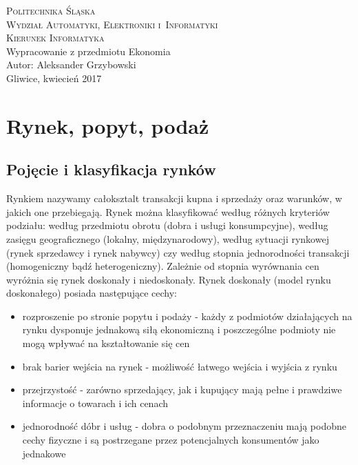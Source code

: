 \documentclass[12pt]{extarticle}
\begin{document}
\begin{titlepage}
    \begin{center}
        \textsc{\LARGE{Politechnika Śląska}}\\[0.5cm]
        \textsc{\LARGE{Wydział Automatyki, Elektroniki i~Informatyki}}\\[0.5cm]
        \textsc{\LARGE{Kierunek Informatyka}}\\[5.5cm]
        \LARGE{Wypracowanie z przedmiotu Ekonomia}\\[1cm]
        \LARGE{Autor: Aleksander Grzybowski}\\[1cm]
        \LARGE{Gliwice, kwiecień 2017}\\[1cm]
    \end{center}
\end{titlepage}



\section{Rynek, popyt, podaż}

\subsection{Pojęcie i klasyfikacja rynków}

Rynkiem nazywamy całoksztalt transakcji kupna i sprzedaży oraz warunków, w jakich one przebiegają. Rynek można klasyfikować według różnych kryteriów podziału: według przedmiotu obrotu (dobra i usługi konsumpcyjne), według zasięgu geograficznego (lokalny, międzynarodowy), według sytuacji rynkowej (rynek sprzedawcy i rynek nabywcy) czy według stopnia jednorodności transakcji (homogeniczny bądź heterogeniczny). Zależnie od stopnia wyrównania cen wyróżnia się rynek doskonały i niedoskonały. Rynek doskonały (model rynku doskonałego) posiada następujące cechy:

\begin{itemize}
	\item rozproszenie po stronie popytu i podaży - każdy z podmiotów działających na rynku dysponuje jednakową siłą ekonomiczną i poszczególne podmioty nie mogą wpływać na kształtowanie się cen
	\item brak barier wejścia na rynek - możliwość łatwego wejścia i wyjścia z rynku
	\item przejrzystość - zarówno sprzedający, jak i kupujący mają pełne i prawdziwe informacje o towarach i ich cenach
	\item jednorodność dóbr i usług - dobra o podobnym przeznaczeniu mają podobne cechy fizyczne i są postrzegane przez potencjalnych konsumentów jako jednakowe
\end{itemize}
\end{document}
